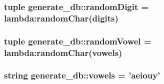 \hypertarget{namespacegenerate__db_4bff979411d2ede7c995cef5b6985702}{
\subsubsection[{randomDigit}]{\setlength{\rightskip}{0pt plus 5cm}tuple {\bf generate\_\-db::randomDigit} = lambda:randomChar({\bf digits})}}
\label{namespacegenerate__db_4bff979411d2ede7c995cef5b6985702}


\hypertarget{namespacegenerate__db_4a5db14b18a9dc595918342e30ad4348}{
\subsubsection[{randomVowel}]{\setlength{\rightskip}{0pt plus 5cm}tuple {\bf generate\_\-db::randomVowel} = lambda:randomChar({\bf vowels})}}
\label{namespacegenerate__db_4a5db14b18a9dc595918342e30ad4348}


\hypertarget{namespacegenerate__db_2a77dc9ebcadb6fc6e8dbf64b04ad056}{
\subsubsection[{vowels}]{\setlength{\rightskip}{0pt plus 5cm}string {\bf generate\_\-db::vowels} = 'aeiouy'}}
\label{namespacegenerate__db_2a77dc9ebcadb6fc6e8dbf64b04ad056}


